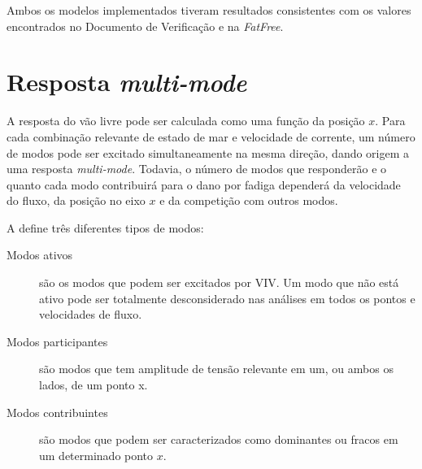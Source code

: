 Ambos os modelos implementados tiveram resultados consistentes com os valores encontrados no Documento de Verificação e na \textit{FatFree}.

\section{Resposta \textit{multi-mode}}

A resposta do vão livre pode ser calculada como uma função da posição $x$.
Para cada combinação relevante de estado de mar e velocidade de corrente, um número de modos pode ser excitado simultaneamente na mesma direção, dando origem a uma resposta \textit{multi-mode}.
Todavia, o número de modos que responderão e o quanto cada modo contribuirá para o dano por fadiga dependerá da velocidade do fluxo, da posição no eixo $x$ e da competição com outros modos.

A  define três diferentes tipos de modos:
\begin{description}
	\item[Modos ativos] são os modos que podem ser excitados por VIV.
Um modo que não está ativo pode ser totalmente desconsiderado nas análises em todos os pontos e velocidades de fluxo.

	\item[Modos participantes] são modos que tem amplitude de tensão relevante em um, ou ambos os lados, de um ponto x.

	\item [Modos contribuintes] são modos que podem ser caracterizados como dominantes ou fracos em um determinado ponto $x$. %
%
%
%
%
%

\end{description}

